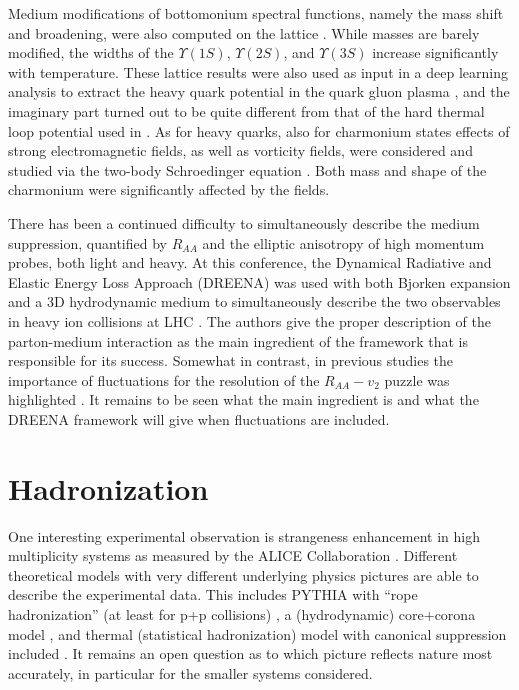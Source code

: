 \documentclass{webofc}
\begin{document}
Medium modifications of bottomonium spectral functions, namely the mass shift and broadening, were also computed on the lattice \cite{Larsen:2019zqv}. While masses are barely modified, the widths of the $\Upsilon(1S)$, $\Upsilon(2S)$, and $\Upsilon(3S)$ increase significantly with temperature. 
These lattice results were also used as input in a deep learning analysis to extract the heavy quark potential in the quark gluon plasma \cite{Shi:2021qri}, and the imaginary part turned out to be quite different from that of the hard thermal loop potential used in \cite{Brambilla:2021wkt}. As for heavy quarks, also for charmonium states effects of strong electromagnetic fields, as well as vorticity fields, were considered and studied via the two-body Schroedinger equation \cite{Chen:2020xsr}. Both mass and shape of the charmonium were significantly affected by the fields.

There has been a continued difficulty to simultaneously describe the medium suppression, quantified by $R_{AA}$ and the elliptic anisotropy of high momentum probes, both light and heavy. At this conference, the Dynamical Radiative and Elastic Energy Loss Approach (DREENA) was used with both Bjorken expansion and a 3D hydrodynamic medium to simultaneously describe the two observables in heavy ion collisions at LHC \cite{Zigic:2018ovr,Zigic:2019sth}. The authors give the proper description of the parton-medium interaction as the main ingredient of the framework that is responsible for its success. Somewhat in contrast, in previous studies the importance of fluctuations for the resolution of the $R_{AA}-v_2$ puzzle was highlighted \cite{Noronha-Hostler:2016eow}. It remains to be seen what the main ingredient is and what the DREENA framework will give when fluctuations are included.

\section{Hadronization}
\label{sec-hadron}
One interesting experimental observation is strangeness enhancement in high multiplicity systems as measured by the ALICE Collaboration \cite{ALICE:2016fzo,ALICE:2019avo}. Different theoretical models with very different underlying physics pictures are able to describe the experimental data. This includes PYTHIA with ``rope hadronization'' (at least for p+p collisions) \cite{Nayak:2018xip}, a (hydrodynamic) core+corona model \cite{Kanakubo:2019ogh}, and thermal (statistical hadronization) model with canonical suppression included \cite{ALICE:2018pal,Wheaton:2004qb}. It remains an open question as to which picture reflects nature most accurately, in particular for the smaller systems considered. 
\end{document}
